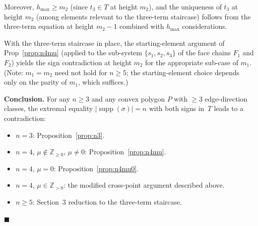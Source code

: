 \documentclass{article}
\begin{document}
Moreover, $h_{\max}\ge m_2$ (since $t_3\in T$ at height $m_2$), and the uniqueness of $t_3$
at height $m_2$ (among elements relevant to the three-term staircase)
follows from the three-term equation at height $m_2-1$ combined with $h_{\max}$ considerations.

With the three-term staircase in place, the starting-element argument of Prop~\ref{prop:n4mu}
(applied to the sub-system $\{s_1,s_2,s_3\}$ of the face chains $F_1$ and $F_2$)
yields the sign contradiction at height $m_2$ for the appropriate sub-case of $m_1$.
(Note: $m_1=m_2$ need not hold for $n\ge 5$; the starting-element choice depends only on the
parity of $m_1$, which suffices.)

\bigskip
\noindent\textbf{Conclusion.}
For any $n\ge 3$ and any convex polygon $P$ with $\ge 3$ edge-direction classes,
the extremal equality $|\operatorname{supp}(\sigma)|=n$ with both signs in~$T$ leads to a contradiction:
\begin{itemize}
  \item $n=3$: Proposition~\ref{prop:n3}.
  \item $n=4$, $\mu\notin\mathbb{Z}_{\ge 0}$, $\mu\ne 0$: Proposition~\ref{prop:n4mu}.
  \item $n=4$, $\mu=0$: Proposition~\ref{prop:n4mu0}.
  \item $n=4$, $\mu\in\mathbb{Z}_{>0}$: the modified cross-point argument described above.
  \item $n\ge 5$: Section~3 reduction to the three-term staircase.
\end{itemize}
$\blacksquare$
\end{document}
